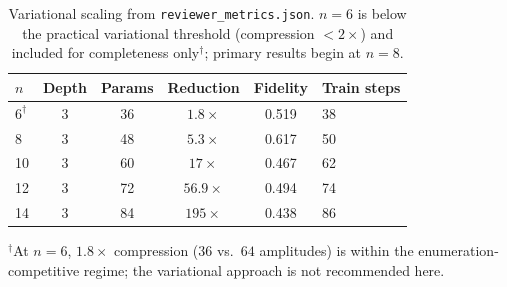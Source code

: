     
    
    \begin{table}[t]
    \centering
    \caption{Variational scaling from \texttt{reviewer\_metrics.json}.
    $n=6$ is below the practical variational threshold (compression
    $< 2\times$) and included for completeness only$^\dagger$; primary
    results begin at $n=8$.}
    \label{tab:variational}
    \begin{tabular}{lccccl}
    \toprule
    \textbf{$n$} & \textbf{Depth} & \textbf{Params} &
    \textbf{Reduction} & \textbf{Fidelity} & \textbf{Train steps} \\
    \midrule
    $6^\dagger$  & 3 & 36 & $1.8\times$   & 0.519 & 38 \\
    8            & 3 & 48 & $5.3\times$   & 0.617 & 50 \\
    10           & 3 & 60 & $17\times$    & 0.467 & 62 \\
    12           & 3 & 72 & $56.9\times$  & 0.494 & 74 \\
    14           & 3 & 84 & $195\times$   & 0.438 & 86 \\
    \bottomrule
    \end{tabular}
    \par\smallskip
    {\footnotesize $^\dagger$At $n=6$, $1.8\times$ compression
    ($36$ vs.\ $64$ amplitudes) is within the enumeration-competitive
    regime; the variational approach is not recommended here.}
    \end{table}
    
    
    
